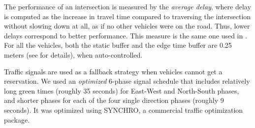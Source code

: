 
The performance of an intersection is measured by the \emph{average
delay}, where delay is computed as the increase in travel time
compared to traversing the intersection without slowing down at all,
as if no other vehicles were on the road. Thus, lower delays
correspond to better performance.  This measure is the same one used
in \cite{bib:Dresner08Multiagent}. For all the vehicles, both the
static buffer and the edge time buffer are 0.25 meters (see
\cite{bib:Dresner08Multiagent} for details), when auto-controlled.

Traffic signals are used as a fallback strategy when vehicles cannot
get a reservation.  We used an \emph{optimized} 6-phase signal
schedule that includes relatively long green times (roughly 35
seconds) for East-West and North-South phases, and shorter phases for
each of the four single direction phases (roughly 9 seconds). It was
optimized using SYNCHRO, a commercial traffic optimization package.




